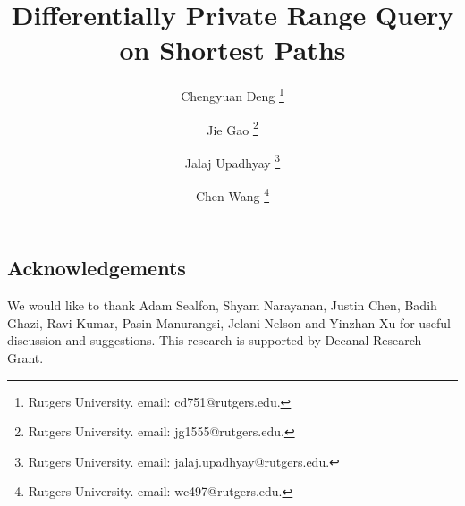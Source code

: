 \documentclass{article}
\title{Differentially Private Range Query on Shortest Paths}
\author{
Chengyuan Deng \thanks{Rutgers University. email: {\sf cd751@rutgers.edu}.} 
\and 
Jie Gao  \thanks{Rutgers University. email: {\sf jg1555@rutgers.edu}.}
\and 
Jalaj Upadhyay \thanks{Rutgers University. email: {\sf jalaj.upadhyay@rutgers.edu}.}
\and 
Chen Wang \thanks{Rutgers University. email: {\sf wc497@rutgers.edu}.}
}%
\theoremstyle{definition}
\begin{document}
\maketitle


\clearpage

\setcounter{tocdepth}{3}
\tableofcontents
\pagebreak

\setcounter{page}{1}















\subsection*{Acknowledgements} We would like to thank Adam Sealfon, Shyam Narayanan, Justin Chen,  Badih Ghazi, Ravi Kumar, Pasin Manurangsi, Jelani Nelson and Yinzhan Xu for useful discussion and suggestions. This research is supported by Decanal Research Grant.



\clearpage
\appendix









% 
\end{document}
